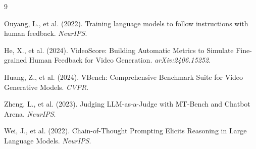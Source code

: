 \documentclass[11pt]{article}
\begin{document}

\begin{thebibliography}{9}

Ouyang, L., et al. (2022).
Training language models to follow instructions with human feedback.
\textit{NeurIPS}.

He, X., et al. (2024).
VideoScore: Building Automatic Metrics to Simulate Fine-grained Human Feedback for Video Generation.
\textit{arXiv:2406.15252}.

Huang, Z., et al. (2024).
VBench: Comprehensive Benchmark Suite for Video Generative Models.
\textit{CVPR}.

Zheng, L., et al. (2023).
Judging LLM-as-a-Judge with MT-Bench and Chatbot Arena.
\textit{NeurIPS}.

Wei, J., et al. (2022).
Chain-of-Thought Prompting Elicits Reasoning in Large Language Models.
\textit{NeurIPS}.

\end{thebibliography}
\end{document}
